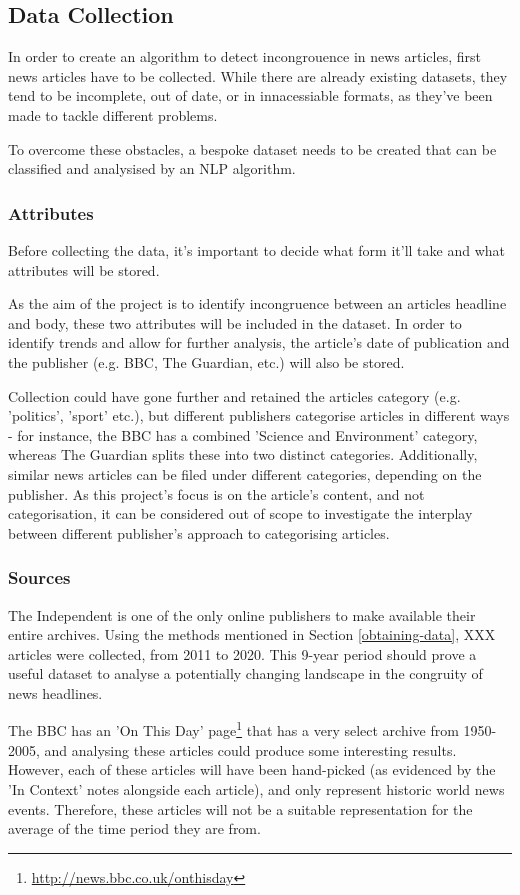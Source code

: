 \subsection{Data Collection}
In order to create an algorithm to detect incongrouence in news articles, first news articles have to be collected. While there are already existing datasets, they tend to be incomplete, out of date, or in innacessiable formats, as they've been made to tackle different problems.

To overcome these obstacles, a bespoke dataset needs to be created that can be classified and analysised by an NLP algorithm.

\subsubsection{Attributes}
Before collecting the data, it's important to decide what form it'll take and what attributes will be stored.

As the aim of the project is to identify incongruence between an articles headline and body, these two attributes will be included in the dataset. In order to identify trends and allow for further analysis, the article's date of publication and the publisher (e.g. BBC, The Guardian, etc.) will also be stored.

Collection could have gone further and retained the articles category (e.g. 'politics', 'sport' etc.), but different publishers categorise articles in different ways - for instance, the BBC has a combined 'Science and Environment' category, whereas The Guardian splits these into two distinct categories. Additionally, similar news articles can be filed under different categories, depending on the publisher. As this project's focus is on the article's content, and not categorisation, it can be considered out of scope to investigate the interplay between different publisher's approach to categorising articles.

\subsubsection{Sources}
The Independent is one of the only online publishers to make available their entire archives. Using the methods mentioned in Section \ref{obtaining-data}, XXX articles were collected, from 2011 to 2020. This 9-year period should prove a useful dataset to analyse a potentially changing landscape in the congruity of news headlines.

The BBC has an 'On This Day' page\footnote{\url{http://news.bbc.co.uk/onthisday}} that has a very select archive from 1950-2005, and analysing these articles could produce some interesting results. However, each of these articles will have been hand-picked (as evidenced by the 'In Context' notes alongside each article), and only represent historic world news events. Therefore, these articles will not be a suitable representation for the average of the time period they are from.

